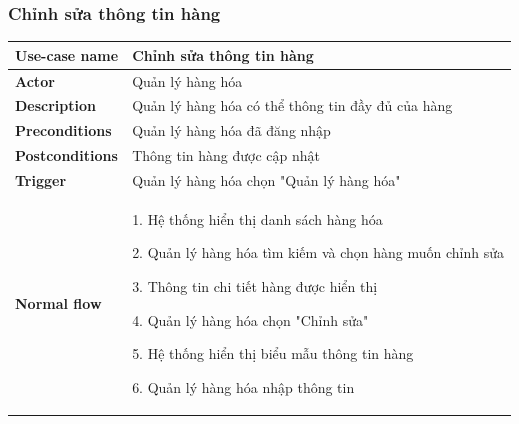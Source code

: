         \subsubsection{Chỉnh sửa thông tin hàng}
        {
\setlength\extrarowheight{6pt}
            \begin{longtable}{| p{} | p{} |} 
                \hline
                    \textbf{Use-case name} 
                & 
                    Chỉnh sửa thông tin hàng
                \\
                \hline
                    \textbf{Actor} 
                & 
                    Quản lý hàng hóa
                \\
                \hline
                    \textbf{Description} 
                & 
                    Quản lý hàng hóa có thể thông tin đầy đủ của hàng
                \\
                \hline
                    \textbf{Preconditions} 
                &
                    Quản lý hàng hóa đã đăng nhập
                \\
                \hline
                    \textbf{Postconditions} 
                & 
                    Thông tin hàng được cập nhật
                \\
                \hline
                    \textbf{Trigger} 
                & 
                    Quản lý hàng hóa chọn "Quản lý hàng hóa"
                \\
                \hline
                \begin{flushleft}
                    \textbf{Normal flow}
                \end{flushleft}
                & 
                1. Hệ thống hiển thị danh sách hàng hóa
                    
                    2. Quản lý hàng hóa tìm kiếm và chọn hàng muốn chỉnh sửa
                    
                    3. Thông tin chi tiết hàng được hiển thị
                    
                    4. Quản lý hàng hóa chọn "Chỉnh sửa"
                    
                    5. Hệ thống hiển thị biểu mẫu thông tin hàng
                    
                    6. Quản lý hàng hóa nhập thông tin
                    

\end{longtable}}
